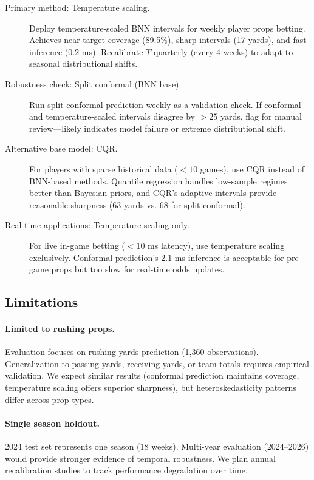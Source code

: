 \begin{description}
    \item[Primary method: Temperature scaling.] Deploy temperature-scaled BNN intervals for weekly player props betting. Achieves near-target coverage (89.5\%), sharp intervals (17 yards), and fast inference (0.2 ms). Recalibrate $T$ quarterly (every 4 weeks) to adapt to seasonal distributional shifts.

    \item[Robustness check: Split conformal (BNN base).] Run split conformal prediction weekly as a validation check. If conformal and temperature-scaled intervals disagree by $>25$ yards, flag for manual review—likely indicates model failure or extreme distributional shift.

    \item[Alternative base model: CQR.] For players with sparse historical data ($<10$ games), use CQR instead of BNN-based methods. Quantile regression handles low-sample regimes better than Bayesian priors, and CQR's adaptive intervals provide reasonable sharpness (63 yards vs. 68 for split conformal).

    \item[Real-time applications: Temperature scaling only.] For live in-game betting ($<10$ ms latency), use temperature scaling exclusively. Conformal prediction's 2.1 ms inference is acceptable for pre-game props but too slow for real-time odds updates.
\end{description}

\subsection{Limitations}\label{subsec:conformal-limitations-empirical}

\paragraph{Limited to rushing props.}
Evaluation focuses on rushing yards prediction (1,360 observations). Generalization to passing yards, receiving yards, or team totals requires empirical validation. We expect similar results (conformal prediction maintains coverage, temperature scaling offers superior sharpness), but heteroskedasticity patterns differ across prop types.

\paragraph{Single season holdout.}
2024 test set represents one season (18 weeks). Multi-year evaluation (2024--2026) would provide stronger evidence of temporal robustness. We plan annual recalibration studies to track performance degradation over time.


